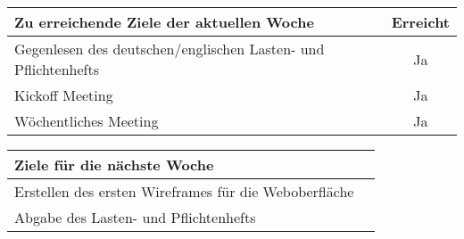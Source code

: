 \begin{tabularx}{\textwidth}{Xc}
    \arrayrulecolor{OliveGreen}
    \toprule
    {\bfseries Zu erreichende Ziele der aktuellen Woche} & {\bfseries Erreicht} \\
    \midrule[2pt]
    Gegenlesen des deutschen/englischen Lasten- und Pflichtenhefts   &Ja     \\
    \rowcolor{OliveGreen!15}
    Kickoff Meeting                                                  &Ja     \\
    \rowcolor{OliveGreen!15}
    Wöchentliches Meeting                                            &Ja     \\
   \bottomrule[2pt]
\end{tabularx}
%
\vspace{1cm}
%
\begin{tabularx}{\textwidth}{Xc}
    \arrayrulecolor{OliveGreen}
    \toprule
    {\bfseries Ziele für die nächste Woche}                     &            \\
    \midrule[2pt]
    Erstellen des ersten Wireframes für die Weboberfläche       &            \\
    \rowcolor{OliveGreen!15}
    Abgabe des Lasten- und Pflichtenhefts                       &            \\
\end{tabularx}
